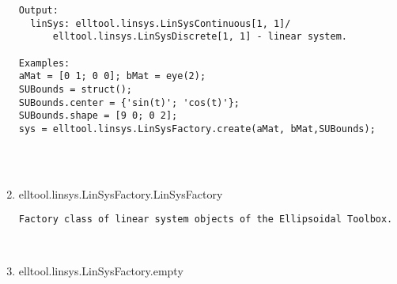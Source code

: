 \begin{enumerate}
\begin{lstlisting}
Output:
  linSys: elltool.linsys.LinSysContinuous[1, 1]/
      elltool.linsys.LinSysDiscrete[1, 1] - linear system.

Examples:
aMat = [0 1; 0 0]; bMat = eye(2);
SUBounds = struct();
SUBounds.center = {'sin(t)'; 'cos(t)'};
SUBounds.shape = [9 0; 0 2];
sys = elltool.linsys.LinSysFactory.create(aMat, bMat,SUBounds);




\end{lstlisting}
\fontfamily{\familydefault}
\selectfont
\item {elltool.linsys.LinSysFactory.LinSysFactory}
\selectfont
\begin{lstlisting}
Factory class of linear system objects of the Ellipsoidal Toolbox.



\end{lstlisting}
\fontfamily{\familydefault}
\selectfont
\item {elltool.linsys.LinSysFactory.empty}
\selectfont
\begin{lstlisting}



\end{lstlisting}
\fontfamily{\familydefault}
\selectfont
\end{enumerate}
